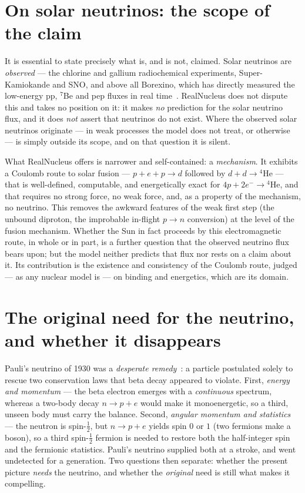 \documentclass[11pt]{article}
\begin{document}
\section{On solar neutrinos: the scope of the claim}
\label{sec:test}

It is essential to state precisely what is, and is not, claimed. Solar neutrinos are \emph{observed} ---
the chlorine and gallium radiochemical experiments, Super-Kamiokande and SNO, and above all Borexino,
which has directly measured the low-energy pp, ${}^7$Be and pep fluxes in real
time~\cite{Borexino,SNO,Adelberger}. RealNucleus does not dispute this and takes no position on it: it
makes \emph{no} prediction for the solar neutrino flux, and it does \emph{not} assert that neutrinos do
not exist. Where the observed solar neutrinos originate --- in weak processes the model does not treat,
or otherwise --- is simply outside its scope, and on that question it is silent.

What RealNucleus offers is narrower and self-contained: a \emph{mechanism}. It exhibits a Coulomb route
to solar fusion --- $p+e+p\to d$ followed by $d+d\to{}^4\mathrm{He}$ --- that is well-defined,
computable, and energetically exact for $4p+2e^-\to{}^4\mathrm{He}$, and that requires no strong force,
no weak force, and, as a property of the mechanism, no neutrino. This removes the awkward features of
the weak first step (the unbound diproton, the improbable in-flight $p\to n$ conversion) at the level of
the fusion mechanism. Whether the Sun in fact proceeds by this electromagnetic route, in whole or in
part, is a further question that the observed neutrino flux bears upon; but the model neither predicts
that flux nor rests on a claim about it. Its contribution is the existence and consistency of the
Coulomb route, judged --- as any nuclear model is --- on binding and energetics, which are its domain.

\section{The original need for the neutrino, and whether it disappears}

Pauli's neutrino of 1930 was a \emph{desperate remedy}~\cite{Pauli}: a particle postulated solely to
rescue two conservation laws that beta decay appeared to violate. First, \emph{energy and momentum} ---
the beta electron emerges with a \emph{continuous} spectrum, whereas a two-body decay $n\to p+e$ would
make it monoenergetic, so a third, unseen body must carry the balance. Second, \emph{angular momentum
and statistics} --- the neutron is spin-$\tfrac12$, but $n\to p+e$ yields spin $0$ or $1$ (two fermions
make a boson), so a third spin-$\tfrac12$ fermion is needed to restore both the half-integer spin and
the fermionic statistics. Pauli's neutrino supplied both at a stroke, and went undetected for a
generation. Two questions then separate: whether the present picture \emph{needs} the neutrino, and
whether the \emph{original} need is still what makes it compelling.
\end{document}
